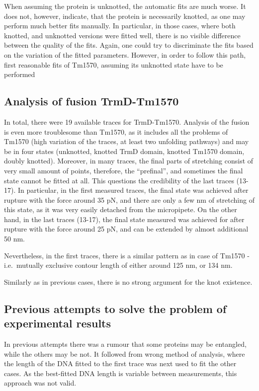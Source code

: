 When assuming the protein is unknotted, the automatic fits are much worse.
It does not, however, indicate, that the protein is necessarily knotted, as one may perform much better fits manually.
In particular, in those cases, where both knotted, and unknotted versions were fitted well, there is no visible difference between the quality of the fits.
Again, one could try to discriminate the fits based on the variation of the fitted parameters.
However, in order to follow this path, first reasonable fits of Tm1570, assuming its unknotted state have to be performed


\subsection{Analysis of fusion TrmD-Tm1570}
\label{subsec:results-experiment-fusion}
In total, there were 19 available traces for TrmD-Tm1570\@.
Analysis of the fusion is even more troublesome than Tm1570, as it includes all the problems of Tm1570 (high variation of the traces, at least two unfolding pathways) and may be in four states (unknotted, knotted TrmD domain, knotted Tm1570 domain, doubly knotted).
Moreover, in many traces, the final parts of stretching consist of very small amount of points, therefore, the ``prefinal'', and sometimes the final state cannot be fitted at all.
This questions the credibility of the last traces (13-17).
In particular, in the first measured traces, the final state was achieved after rupture with the force around 35 pN, and there are only a few nm of stretching of this state, as it was very easily detached from the micropipete.
On the other hand, in the last traces (13-17), the final state measured was achieved for after rupture with the force around 25 pN, and can be extended by almost additional 50 nm.

Nevertheless, in the first traces, there is a similar pattern as in case of Tm1570 - i.e.\ mutually exclusive contour length of either around 125 nm, or 134 nm.

Similarly as in previous cases, there is no strong argument for the knot existence.

\subsection{Previous attempts to solve the problem of experimental results}
\label{subsec:results-experiment-previous}
In previous attempts there was a rumour that some proteins may be entangled, while the others may be not.
It followed from wrong method of analysis, where the length of the DNA fitted to the first trace was next used to fit the other cases.
As the best-fitted DNA length is variable between measurements, this approach was not valid.


